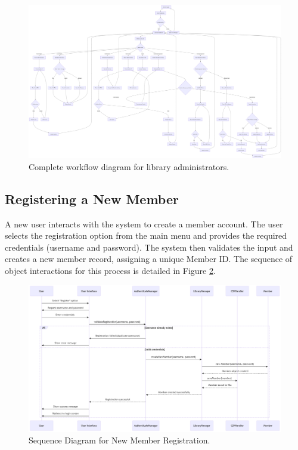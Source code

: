 \begin{figure}[H]
	\centering
	\includegraphics[width=\textwidth]{figures/librarian_workflow.png}
	\caption{Complete workflow diagram for library administrators.}
	\label{fig:librarian_workflow}
\end{figure}

\newpage

\subsection{Registering a New Member}
A new user interacts with the system to create a member account. The user selects the registration option from the main menu and provides the required credentials (username and password). The system then validates the input and creates a new member record, assigning a unique Member ID. The sequence of object interactions for this process is detailed in Figure \ref{fig:seq_register}.

\begin{figure}[H]
	\centering
	\includegraphics[width=\textwidth]{figures/sequence_register.png}
	\caption{Sequence Diagram for New Member Registration.}
	\label{fig:seq_register}
\end{figure}

